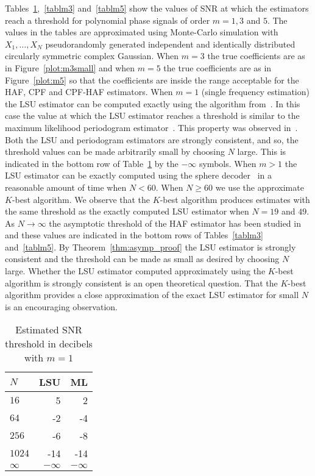 \documentclass[journal]{IEEEtran}
\begin{document}
Tables~\ref{tablm1},~\ref{tablm3} and~\ref{tablm5} show the values of SNR at which the estimators reach a threshold for polynomial phase signals of order $m=1,3$ and $5$.  The values in the tables are approximated using Monte-Carlo simulation with $X_1, \dots, X_N$ pseudorandomly generated independent and identically distributed circularly symmetric complex Gaussian.  When $m=3$ the true coefficients are as in Figure~\ref{plot:m3small} and when $m=5$ the true coefficients are as in Figure~\ref{plot:m5} so that the coefficients are inside the range acceptable for the HAF, CPF and CPF-HAF estimators.  When $m=1$ (single frequency estimation) the LSU estimator can be computed exactly using the algorithm from~\cite{McKilliamFrequencyEstimationByPhaseUnwrapping2009}.  In this case the value at which the LSU estimator reaches a threshold is similar to the maximum likelihood periodogram estimator~\cite{Quinn2001,Hannan1973,Rife1974}.  This property was observed in~\cite{McKilliamFrequencyEstimationByPhaseUnwrapping2009}.  Both the LSU and periodogram estimators are strongly consistent, and so, the threshold values can be made arbitrarily small by choosing $N$ large.  This is indicated in the bottom row of Table~\ref{tablm1} by the $-\infty$ symbols.  When $m>1$ the LSU estimator can be exactly computed using the sphere decoder~\cite{Agrell2002,Viterbo_sphere_decoder_1999} in a reasonable amount of time when $N < 60$.  When $N \geq 60$ we use the approximate $K$-best algorithm.  We observe that the $K$-best algorithm produces estimates with the same threshold as the exactly computed LSU estimator when $N = 19$ and $49$.  As $N\rightarrow\infty$ the asymptotic threshold of the HAF estimator has been studied in~\cite{Porat_asympt_HAF_DPT_1996} and these values are indicated in the bottom rows of Tables~\ref{tablm3} and~\ref{tablm5}.  By Theorem~\ref{thm:asymp_proof} the LSU estimator is strongly consistent and the threshold can be made as small as desired by choosing $N$ large.  Whether the LSU estimator computed approximately using the $K$-best algorithm is strongly consistent is an open theoretical question.  That the $K$-best algorithm provides a close approximation of the exact LSU estimator for small $N$ is an encouraging observation.
 
\begin{table}[t]
\centering
\begin{tabular}{lrr}
$N$ & LSU & ML  \\ \toprule
$16$ & 5 & 2  \\ 
$64$ & -2 & -4 \\ 
$256$ & -6 & -8 \\ 
$1024$ & -14 & -14 \\ 
$\infty$ & $-\infty$ & $-\infty$  \\ \bottomrule
\end{tabular}
\caption{Estimated SNR threshold in decibels with $m=1$}
\label{tablm1}
\end{table}
\end{document}
